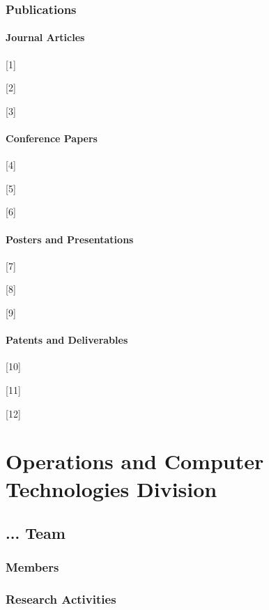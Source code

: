 \documentclass{book}
\begin{document}
\section{Publications}

\subsection{Journal Articles}

[1] 

[2]

[3]

\subsection{Conference Papers}

[4]

[5]

[6]

\subsection{Posters and Presentations}

[7]

[8]

[9]

\subsection{Patents and Deliverables}

[10]

[11]

[12]

\part{Operations and Computer Technologies Division}

\chapter{... Team}

\section{Members}

\section{Research Activities}
\end{document}
